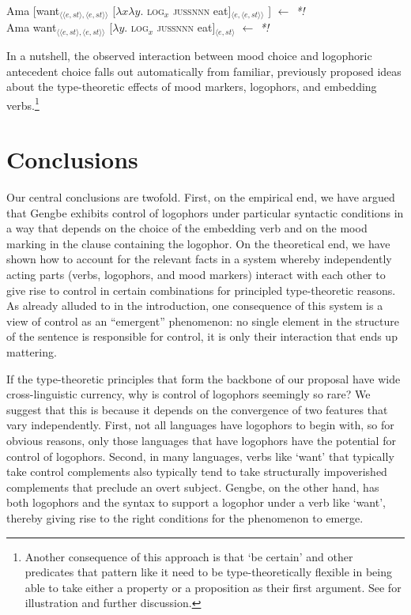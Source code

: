 \documentclass[output=paper,modfonts,nonflat]{langsci/langscibook}
\begin{document}
\ea \label{ex:grano:remote':34}
    \begin{xlist}
    \ex Ama [want$_{\langle\langle e,st\rangle,\langle e,st\rangle\rangle}$ [$\lambda x\lambda y$. \textsc{log}$_{x}$ \textsc{jussnnn} eat]$_{\langle e,\langle e,st\rangle\rangle}$ ] \hfill $\leftarrow$ \emph{*!}\\
    \ex Ama want$_{\langle\langle e,st\rangle,\langle e,st\rangle\rangle}$ [$\lambda y$. \textsc{log}$_{x}$ \textsc{jussnnn} eat]$_{\langle e,st\rangle}$  \hfill $\leftarrow$ \emph{*!}
    \end{xlist}
\z




In a nutshell, the observed interaction between mood choice and logophoric antecedent choice falls out automatically from familiar, previously proposed ideas about the type-theoretic effects of mood markers, logophors, and embedding verbs.\footnote{Another consequence of this approach is that `be certain' and other predicates that pattern like it  need to be type-theoretically flexible in being able to take either a property or a proposition as their first argument. See \citet{GranoToappear} for illustration and further discussion.}




\section{Conclusions}\largerpage
\label{sec:Grano:Conclusions:5}

Our central conclusions are twofold. First, on the empirical end, we have argued that Gengbe exhibits  control of logophors under particular syntactic conditions in a way that depends on the choice of the embedding verb and on the mood marking in the clause containing the logophor. On the theoretical end, we have shown how to account for the relevant facts in a system whereby independently acting parts (verbs, logophors, and mood markers)  interact with each other to give rise to control in certain combinations for principled type-theoretic reasons. As already alluded to in the introduction, one consequence of this system is a view of control as an ``emergent'' phenomenon: no single element in the structure of the sentence is responsible for control, it is only their interaction that ends up mattering.

If the type-theoretic principles that form the backbone of our proposal have wide cross-linguistic currency, why is control of logophors seemingly so rare?  We suggest that this is because it depends on the convergence of two features that vary independently. First, not all languages have logophors to begin with, so for obvious reasons, only those languages that have logophors have the potential for control of logophors. Second, in many languages, verbs like `want' that typically take control complements also typically tend to take structurally impoverished complements that preclude an overt subject. Gengbe, on the other hand, has both logophors and the syntax to support a logophor under a verb like `want', thereby giving rise to the right conditions for the phenomenon to emerge.
\end{document}
